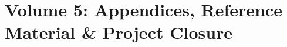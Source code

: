 \documentclass[10pt,twocolumn,a4paper]{article}
\begin{document}


\clearpage
\part{Volume 5: Appendices, Reference Material \& Project Closure}























\printbibliography
\end{document}
